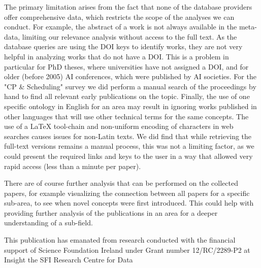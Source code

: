 \documentclass[
 hf]{ceurart}
\begin{document}
The primary limitation arises from the fact that none of the database providers offer comprehensive data, which restricts the scope of the analyses we can conduct. For example, the abstract of a work is not always available in the meta-data, limiting our relevance analysis without access to the full text. As the database queries are using the DOI keys to identify works, they are not very helpful in analyzing works that do not have a DOI. This is a problem in particular for PhD theses, where universities have not assigned a DOI, and for older (before 2005) AI conferences, which were published by AI societies. For the "CP \& Scheduling" survey we did perform a manual search of the proceedings by hand to find all relevant early publications on the topic. Finally, the use of one specific ontology in English for an area may result in ignoring works published in other languages that will use other technical terms for the same concepts. The use of a LaTeX tool-chain and non-uniform encoding of characters in web searches causes issues for non-Latin texts. We did find that while retrieving the full-text versions remains a manual process, this was not a limiting factor, as we could present the required links and keys to the user in a way that allowed very rapid access (less than a minute per paper). 

There are of course further analysis that can be performed on the collected papers, for example visualizing the connection between all papers for a specific sub-area, to see when novel concepts were first introduced. This could help with providing further analysis of the publications in an area for a deeper understanding of a sub-field.   


\begin{acknowledgments}
This publication has emanated from research conducted with the financial support of Science Foundation Ireland under Grant number  12/RC/2289-P2 at Insight the SFI Research Centre for Data %
\end{acknowledgments}


\end{document}
